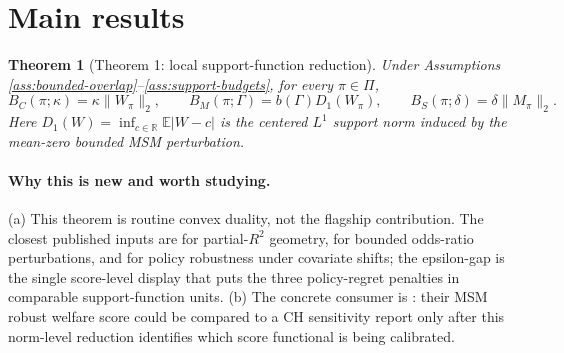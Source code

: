 \documentclass[11pt]{article}
\newcommand{\E}{\mathbb{E}}
\newcommand{\R}{\mathbb{R}}
\theoremstyle{definition}
\theoremstyle{plain}
\newtheorem{theorem}{Theorem}
\theoremstyle{remark}
\begin{document}
\section{Main results}
\begin{theorem}[Theorem 1: local support-function reduction]\label{thm:support-reduction}
Under Assumptions \ref{ass:bounded-overlap}--\ref{ass:support-budgets}, for every $\pi\in\Pi$,
\[
  B_C(\pi;\kappa)=\kappa\|W_{\pi}\|_2,\qquad
  B_M(\pi;\Gamma)=b(\Gamma)D_1(W_{\pi}),\qquad
  B_S(\pi;\delta)=\delta\|M_{\pi}\|_2.
\]
Here $D_1(W)=\inf_{c\in\R}\E|W-c|$ is the centered $L^1$ support norm induced by the mean-zero bounded MSM perturbation.
\end{theorem}

\paragraph{Why this is new and worth studying.}
(a) This theorem is routine convex duality, not the flagship contribution.  The closest published inputs are \citet{CinelliHazlett2020} for partial-$R^2$ geometry, \citet{ZhaoSmallBhattacharya2019} for bounded odds-ratio perturbations, and \citet{AdjahoChristensen2025} for policy robustness under covariate shifts; the epsilon-gap is the single score-level display that puts the three policy-regret penalties in comparable support-function units.  (b) The concrete consumer is \citet{JinXuZhengZhou2025}: their MSM robust welfare score could be compared to a CH sensitivity report only after this norm-level reduction identifies which score functional is being calibrated.
\end{document}
